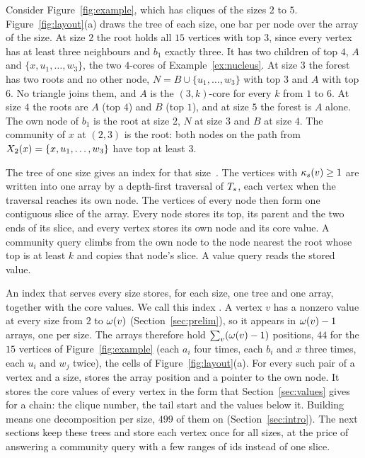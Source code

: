 \begin{example}\label{ex:tree}
Consider Figure~\ref{fig:example}, which has cliques of the sizes $2$ to $5$.
%
Figure~\ref{fig:layout}(a) draws the tree of each size, one bar per node over the array of the size.
%
At size $2$ the root holds all $15$ vertices with top $3$, since every vertex has at least three neighbours and $b_1$ exactly three.
%
It has two children of top $4$, $A$ and $\{x,u_1,\dots,w_3\}$, the two $4$-cores of Example~\ref{ex:nucleus}.
%
At size $3$ the forest has two roots and no other node, $N=B\cup\{u_1,\dots,w_3\}$ with top $3$ and $A$ with top $6$.
%
No triangle joins them, and $A$ is the $(3,k)$-core for every $k$ from $1$ to $6$.
%
At size $4$ the roots are $A$ (top $4$) and $B$ (top $1$), and at size $5$ the forest is $A$ alone.
%
The own node of $b_1$ is the root at size $2$, $N$ at size $3$ and $B$ at size $4$.
%
The community of $x$ at $(2,3)$ is the root: both nodes on the path from $X_{2}(x)=\{x,u_1,\dots,w_3\}$ have top at least $3$.
\end{example}

The tree of one size gives an index for that size~\cite{fastHierarchy,Fang2016CLtree}.
%
The vertices with $\kappa_{s}(v)\ge1$ are written into one array by a depth-first traversal of $T_{s}$, each vertex when the traversal reaches its own node.
%
The vertices of every node then form one contiguous slice of the array.
%
Every node stores its top, its parent and the two ends of its slice, and every vertex stores its own node and its core value.
%
A community query climbs from the own node to the node nearest the root whose top is at least $k$ and copies that node's slice.
%
A value query reads the stored value.

An index that serves every size stores, for each size, one tree and one array, together with the core values.
%
We call this index \strees.
%
A vertex $v$ has a nonzero value at every size from $2$ to $\omega(v)$ (Section~\ref{sec:prelim}), so it appears in $\omega(v)-1$ arrays, one per size.
%
The arrays therefore hold $\sum_v(\omega(v)-1)$ positions, $44$ for the $15$ vertices of Figure~\ref{fig:example} (each $a_i$ four times, each $b_i$ and $x$ three times, each $u_i$ and $w_j$ twice), the cells of Figure~\ref{fig:layout}(a).
%
For every such pair of a vertex and a size, \strees stores the array position and a pointer to the own node.
%
It stores the core values of every vertex in the form that Section~\ref{sec:values} gives for a chain: the clique number, the tail start and the values below it.
%
Building \strees means one decomposition per size, $499$ of them on \webuk (Section~\ref{sec:intro}).
%
The next sections keep these trees and store each vertex once for all sizes, at the price of answering a community query with a few ranges of ids instead of one slice.
